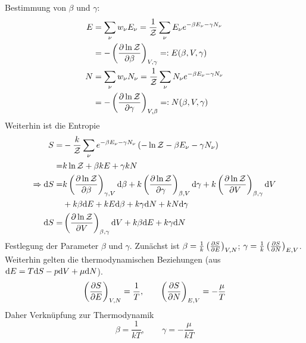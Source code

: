 \begin{enumerate}[A)]
    Bestimmung von $\beta$ und $\gamma$:
    \begin{equation}
        \begin{split}
            E &= \sum_\nu w_\nu E_\nu = \frac{1}{\mathcal{Z}} \sum_\nu E_\nu e^{- \beta E_\nu - \gamma N_\nu} \\
            &= - \left( \frac{\partial \ln \mathcal{Z}}{\partial \beta} \right)_{V, \gamma} =: E(\beta, V, \gamma) \\
            N &= \sum_\nu w_\nu N_\nu = \frac{1}{\mathcal{Z}} \sum_\nu N_\nu e^{- \beta E_\nu - \gamma N_\nu} \\
            &= - \left( \frac{\partial \ln \mathcal{Z}}{\partial \gamma} \right)_{V, \beta} =: N(\beta, V, \gamma)
        \end{split}
    \end{equation}
    Weiterhin ist die Entropie
    \begin{equation}
        \begin{split}
            S =& - \frac{k}{\mathcal{Z}} \sum_\nu e^{-\beta E_\nu - \gamma N_\nu} \left( - \ln \mathcal{Z} - \beta E_\nu - \gamma N_\nu \right) \\
            =& k \ln \mathcal{Z} + \beta k E + \gamma k N \\
            \Rightarrow  \mathrm{d} S =& k \left( \frac{\partial \ln \mathcal{Z}}{\partial \beta} \right)_{\gamma, V} \mathrm{d} \beta + k \left( \frac{\partial \ln \mathcal{Z}}{\partial \gamma} \right)_{\beta, V} \mathrm{d} \gamma +
            k \left( \frac{\partial \ln \mathcal{Z}}{\partial V} \right)_{\beta, \gamma} \mathrm{d} V \\
            & + k \beta \mathrm{d} E + k E \mathrm{d} \beta + k \gamma \mathrm{d} N + k N \mathrm{d} \gamma \\
            \mathrm{d} S =& \left( \frac{\partial \ln \mathcal{Z}}{\partial V} \right)_{\beta, \gamma} \mathrm{d} V + k \beta \mathrm{d} E + k \gamma \mathrm{d} N
        \end{split}
    \end{equation}
    Festlegung der Parameter $\beta$ und $\gamma$. Zunächst ist $\beta = \frac{1}{k} \left( \frac{\partial S}{\partial E} \right)_{V, N} $; $\gamma = \frac{1}{k} \left( \frac{\partial S}{\partial N} \right)_{E, V}$.
    Weiterhin gelten die thermodynamischen Beziehungen (aus $\mathrm{d} E = T \mathrm{d} S - p \mathrm{d} V + \mu \mathrm{d} N$).
    \begin{equation}
        \left( \frac{\partial S}{\partial E} \right)_{V, N} = \frac{1}{T}, \qquad \left( \frac{\partial S}{\partial N} \right)_{E, V} = - \frac{\mu}{T}
    \end{equation}
    Daher Verknüpfung zur Thermodynamik
    \begin{equation}
        \beta = \frac{1}{k T}, \qquad  \gamma = - \frac{\mu}{k T}
    \end{equation}
\end{enumerate}

